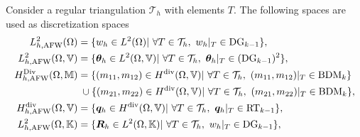 Consider a regular triangulation $\mathcal{T}_h$ with elements $T$. The following spaces are used as discretization spaces
\begin{equation}
\label{eq:AFW}
\begin{aligned}
L_{h, \text{AFW}}^2(\Omega) &= \{w_h \in L^2(\Omega) | \ \forall T \in \mathcal{T}_h, \ w_h|_{T} \in \mathrm{DG}_{k-1} \}, \\
L_{h, \text{AFW}}^2(\Omega, \mathbb{V}) &= \{\bm{\theta}_h \in L^2(\Omega, \mathbb{V}) | \ \forall T \in \mathcal{T}_h,\ \bm{\theta}_h|_{T} \in (\mathrm{DG}_{k-1})^2 \}, \\
H_{h, \text{AFW}}^{\Div}(\Omega, \mathbb{M}) &= \{(m_{11}, m_{12}) \in H^{\div}(\Omega, \mathbb{V})| \ \forall T \in \mathcal{T}_h,\ (m_{11}, m_{12})|_{T} \in \mathrm{BDM}_{k} \}  \\
& \; \cup \{(m_{21}, m_{22}) \in H^{\div}(\Omega, \mathbb{V})| \ \forall T \in \mathcal{T}_h,\ (m_{21}, m_{22})|_{T} \in \mathrm{BDM}_{k} \}, \\
H_{h, \text{AFW}}^{\div}(\Omega, \mathbb{V}) &= \{\bm{q}_h \in H^{\div}(\Omega, \mathbb{V}) | \ \forall T \in \mathcal{T}_h,\ \bm{q}_h|_{T} \in \mathrm{RT}_{k-1} \}, \\
L_{h, \text{AFW}}^2(\Omega, \mathbb{K}) &= \{\bm{R}_h \in L^2(\Omega, \mathbb{K}) | \ \forall T \in \mathcal{T}_h, \ w_h|_{T} \in \mathrm{DG}_{k-1} \}, \\ 
\end{aligned}
\end{equation}

